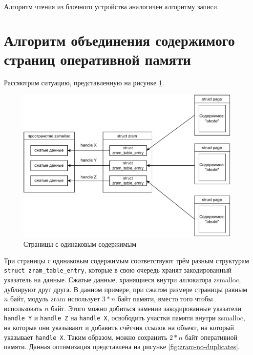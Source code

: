 \documentclass[12pt, a4paper]{article}
\begin{document}
Алгоритм чтения из блочного устройства аналогичен алгоритму записи.

\section{Алгоритм объединения содержимого страниц оперативной памяти}

Рассмотрим ситуацию, представленную на рисунке \ref{fig:zram-duplicates}. 

\begin{figure}[h]
	\centering
	\includegraphics[width=\textwidth]{img/zram-duplicates.pdf}
	\caption{Страницы с одинаковым содержимым}
	\label{fig:zram-duplicates}
\end{figure}

Три страницы с одинаковым содержимым соответствуют трём разным структурам \texttt{struct zram\_table\_entry}, которые в свою очередь хранят закодированный указатель на данные. Сжатые данные, хранящиеся внутри аллокатора zsmalloc, дублируют друг друга. В данном примере, при сжатом размере страницы равным $n$ байт, модуль zram использует $3 * n$ байт памяти, вместо того чтобы использовать $n$ байт. 
Этого можно добиться заменив закодированные указатели \texttt{handle Y} и \texttt{handle Z} на \texttt{handle X}, освободить участки памяти внутри zsmalloc, на которые они указывают и добавить счётчик ссылок на объект, на который указывает \texttt{handle X}. Таким образом, можно сохранить $2 * n$ байт оперативной памяти. Данная оптимизация представлена на рисунке \ref{fig:zram-no-duplicates}.
\end{document}
